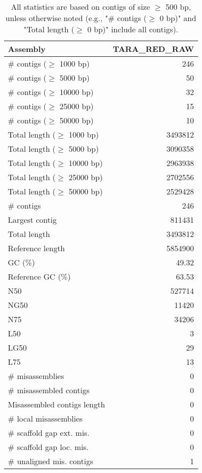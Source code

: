 \documentclass[12pt,a4paper]{article}
\begin{document}
\begin{table}[ht]
\begin{center}
\caption{All statistics are based on contigs of size $\geq$ 500 bp, unless otherwise noted (e.g., "\# contigs ($\geq$ 0 bp)" and "Total length ($\geq$ 0 bp)" include all contigs).}
\begin{tabular}{|l*{1}{|r}|}
\hline
Assembly & TARA\_RED\_RAW \\ \hline
\# contigs ($\geq$ 1000 bp) & 246 \\ \hline
\# contigs ($\geq$ 5000 bp) & 50 \\ \hline
\# contigs ($\geq$ 10000 bp) & 32 \\ \hline
\# contigs ($\geq$ 25000 bp) & 15 \\ \hline
\# contigs ($\geq$ 50000 bp) & 10 \\ \hline
Total length ($\geq$ 1000 bp) & 3493812 \\ \hline
Total length ($\geq$ 5000 bp) & 3090358 \\ \hline
Total length ($\geq$ 10000 bp) & 2963938 \\ \hline
Total length ($\geq$ 25000 bp) & 2702556 \\ \hline
Total length ($\geq$ 50000 bp) & 2529428 \\ \hline
\# contigs & 246 \\ \hline
Largest contig & 811431 \\ \hline
Total length & 3493812 \\ \hline
Reference length & 5854900 \\ \hline
GC (\%) & 49.32 \\ \hline
Reference GC (\%) & 63.53 \\ \hline
N50 & 527714 \\ \hline
NG50 & 11420 \\ \hline
N75 & 34206 \\ \hline
L50 & 3 \\ \hline
LG50 & 29 \\ \hline
L75 & 13 \\ \hline
\# misassemblies & 0 \\ \hline
\# misassembled contigs & 0 \\ \hline
Misassembled contigs length & 0 \\ \hline
\# local misassemblies & 0 \\ \hline
\# scaffold gap ext. mis. & 0 \\ \hline
\# scaffold gap loc. mis. & 0 \\ \hline
\# unaligned mis. contigs & 1 \\ \hline

\end{tabular}
\end{center}
\end{table}
\end{document}
